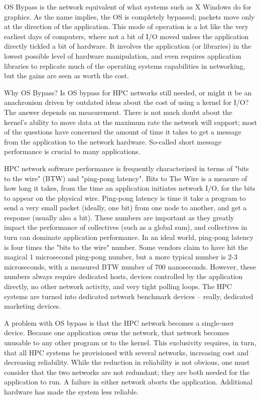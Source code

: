 \documentclass[letterpaper,twocolumn,10pt]{article}
\begin{document}
OS Bypass is the network equivalent of what systems such as X Windows do for graphics. 
As the name implies, the OS is completely bypassed; packets move only at the 
direction of the application. This mode of operation is a lot like the very earliest
days of computers, where not a bit of I/O moved unless the application
directly tickled a bit of hardware. It involves the application (or libraries) in the
lowest possible level of hardware manipulation, and even requires
application libraries to replicate much of the operating systems
capabilities in networking, but the gains are seen as worth the cost.

Why OS Bypass? Is OS bypass for HPC networks still needed, or might it be an anachronism driven
by outdated ideas about the cost of using a kernel for I/O?
The answer depends on measurement. There is not much doubt about the kernel's ability to move
data at the maximum rate the network will support; most of the questions have concerned the amount of 
time it takes to get a message from the application to the network hardware. 
So-called short message performance is crucial to many applications. 

HPC network software performance is frequently characterized in terms of "bits to the wire" (BTW) and "ping-pong latency". 
Bits to The Wire is a measure of how long it takes, 
from the time an application initiates
network I/O, for the bits to appear on the physical wire. Ping-pong latency 
is time it take a program to send a very small packet (ideally, one bit) from 
one node to another, and get a response (usually also a bit). 
These numbers are important as they greatly impact the performance of collectives (such as a global sum), 
and collectives in turn can dominate application performance\cite{petrini}\cite{ 10.1109/HPC.1997.592137}\cite{quadrics}.
In an ideal world, ping-pong latency is four times the "bits to the wire" number. 
Some vendors claim to have hit the magical 1 microsecond ping-pong number, but a more typical 
number is 2-3 microseconds, with a measured BTW number of 700 nanoseconds. 
However, these numbers always require dedicated hosts, devices
controlled by the application directly, no other network activity, 
and very tight polling loops. The HPC systems are turned into dedicated network benchmark devices -- really, dedicated marketing devices. 

A problem with OS bypass is that the HPC network becomes a single-user device. Because one application 
owns the network, that network becomes unusable to any other program or to the kernel. This exclusivity requires, in turn, that all
HPC systems be provisioned with several networks, increasing cost and decreasing reliability. While the reduction in reliability is not obvious, one must consider 
that the two networks are not redundant; they are both needed for the application
to run. A failure in either network aborts the application. Additional hardware has made the system less reliable. 
\end{document}
